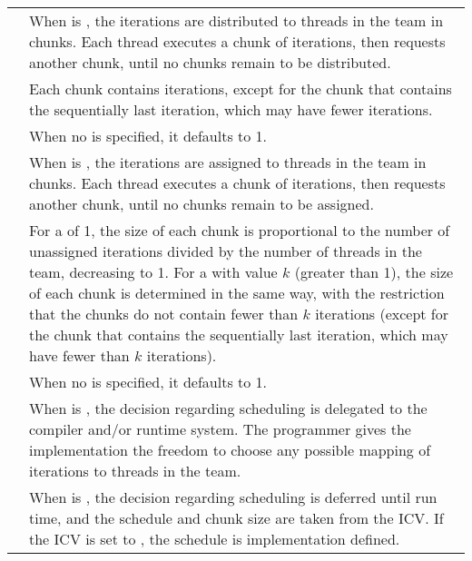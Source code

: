\begin{supertabular}{ p{0.8in} p{4.3in} }
{} & When  is ,
                    the iterations are distributed to threads in the team
                    in chunks. Each thread executes a chunk of iterations, then 
                    requests another chunk, until no chunks remain to be distributed. \\

                  & Each chunk contains {} iterations, except for
                    the chunk that contains the sequentially last iteration, which 
                    may have fewer iterations.\\

                  & When no {} is specified, it defaults to 1.\\

{} & When  is ,
                   the iterations are assigned to threads in the team
                   in chunks. Each thread executes a chunk of iterations, then 
                   requests another chunk, until no chunks remain to be assigned.\\

                 & For a {} of 1, the size of each chunk is 
                   proportional to the number of unassigned iterations divided by 
                   the number of threads in the team, decreasing to 1. For a 
                   {} with value $k$ (greater than 1), the
                   size of each chunk is determined in the same way, with the 
                   restriction that the chunks do not contain fewer than $k$ 
                   iterations (except for the chunk that contains the sequentially 
                   last iteration, which may have fewer than $k$ iterations). \\

                 & When no {} is specified, it defaults to 1.\\

{} & When  is ,
                 the decision regarding scheduling is delegated to the
                 compiler and/or runtime system. The programmer gives the
                 implementation the freedom to choose any possible mapping of
                 iterations to threads in the team.\\

{} & When  is ,
                    the decision regarding scheduling is deferred until run
                    time, and the schedule and chunk size are taken from the
                    {} ICV. If the ICV is set to
                    {}, the schedule is implementation defined.\\
\end{supertabular}

